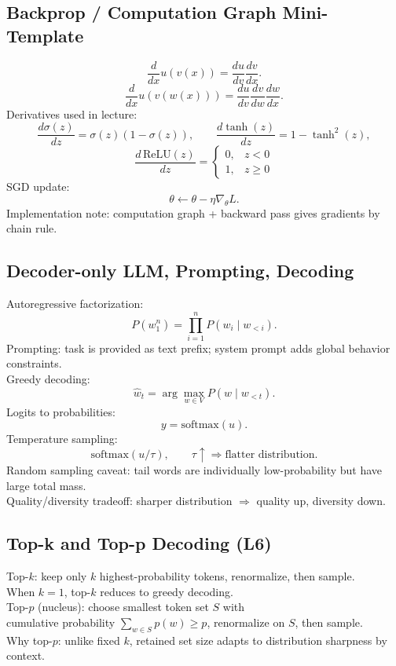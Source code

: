 \subsection*{Backprop / Computation Graph Mini-Template}
\[
\frac{d}{dx}u(v(x))=\frac{du}{dv}\frac{dv}{dx}.
\]
\[
\frac{d}{dx}u(v(w(x)))=\frac{du}{dv}\frac{dv}{dw}\frac{dw}{dx}.
\]
Derivatives used in lecture:
\[
\frac{d\sigma(z)}{dz}=\sigma(z)(1-\sigma(z)),\qquad
\frac{d\tanh(z)}{dz}=1-\tanh^2(z),
\]
\[
\frac{d\,\mathrm{ReLU}(z)}{dz}=
\begin{cases}
0,&z<0\\
1,&z\ge 0
\end{cases}
\]
SGD update:
\[
\theta\leftarrow\theta-\eta\nabla_\theta L.
\]
Implementation note: computation graph + backward pass gives gradients by chain rule.

\subsection*{Decoder-only LLM, Prompting, Decoding}
Autoregressive factorization:
\[
P(w_1^n)=\prod_{i=1}^{n}P(w_i\mid w_{<i}).
\]
Prompting: task is provided as text prefix; system prompt adds global behavior constraints.\\
Greedy decoding:
\[
\hat w_t=\arg\max_{w\in V}P(w\mid w_{<t}).
\]
Logits to probabilities:
\[
y=\mathrm{softmax}(u).
\]
Temperature sampling:
\[
\mathrm{softmax}(u/\tau),\qquad
\tau\uparrow \Rightarrow \text{flatter distribution}.
\]
Random sampling caveat: tail words are individually low-probability but have large total mass.\\
Quality/diversity tradeoff: sharper distribution $\Rightarrow$ quality up, diversity down.

\subsection*{Top-k and Top-p Decoding (L6)}
Top-$k$: keep only $k$ highest-probability tokens, renormalize, then sample.\\
When $k=1$, top-$k$ reduces to greedy decoding.\\
Top-$p$ (nucleus): choose smallest token set $S$ with\\
cumulative probability $\sum_{w\in S}p(w)\ge p$, renormalize on $S$, then sample.\\
Why top-$p$: unlike fixed $k$, retained set size adapts to distribution sharpness by context.

